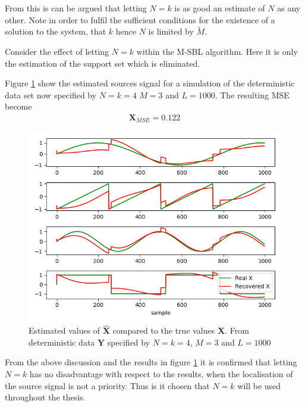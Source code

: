 From this is can be argued that letting $N = k$ is as good an estimate of $N$ as any other. Note in order to fulfil the sufficient conditions for the existence of a solution to the system, that $k$ hence $N$ is limited by $\widetilde{M}$.     

Consider the effect of letting $N = k$ within the M-SBL algorithm. Here it is only the estimation of the support set which is eliminated.   

Figure \ref{fig:M-SBL_simple3} show the estimated sources signal for a simulation of the deterministic data set now specified by $N=k=4$ $M = 3$ and $L=1000$. The resulting MSE become
\begin{align*}
\textbf{X}_{MSE} = 0.122
\end{align*}

\begin{figure}[H]
\centering
\includegraphics[scale=0.5]{figures/ch_6/M-SBL_simple3.png}
\caption{Estimated values of $\hat{\textbf{X}}$ compared to the true 				values $\textbf{X}$. From deterministic data $\textbf{Y}$ specified by $N=k=4$, $M = 3$ and $L=1000$ }
\label{fig:M-SBL_simple3}
\end{figure}

From the above discussion and the results in figure \ref{fig:M-SBL_simple3} it is confirmed that letting $N=k$ has no disadvantage with respect to the results, when the localisation of the source signal is not a priority. Thus is it chosen that $N=k$ will be used throughout the thesis. 

